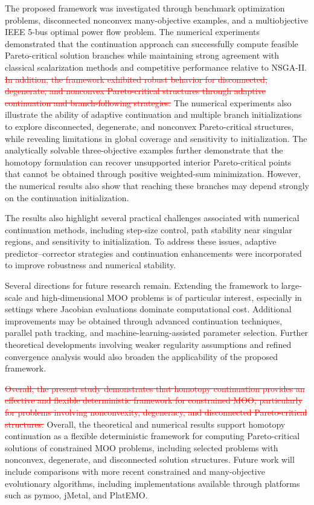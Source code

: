 \documentclass[11pt,pdflatex,sn-mathphys-ay]{sn-jnl}%
\theoremstyle{definition}
\theoremstyle{thmstyleone}%
\theoremstyle{thmstyletwo}%
\theoremstyle{thmstylethree}%
\newcommand{\del}[1]{\textcolor{red}{\sout{#1}}}
\newcommand{\add}[1]{\textcolor{revisionblue}{#1}}
\begin{document}
	
	The proposed framework was investigated through benchmark optimization problems, disconnected nonconvex many-objective examples, and a multiobjective IEEE 5-bus optimal power flow problem. The numerical experiments demonstrated that the continuation approach can successfully compute feasible Pareto-critical solution branches while maintaining strong agreement with classical scalarization methods and competitive performance relative to NSGA-II. 
	\del{In addition, the framework exhibited robust
		behavior for disconnected, degenerate, and
		nonconvex Pareto-critical structures through
		adaptive continuation and branch-following
		strategies.}
	\add{The numerical experiments also illustrate
		the ability of adaptive continuation and
		multiple branch initializations to explore
		disconnected, degenerate, and nonconvex
		Pareto-critical structures, while revealing
		limitations in global coverage and
		sensitivity to initialization.} 
	\add{The analytically solvable three-objective
		examples further demonstrate that the
		homotopy formulation can recover unsupported
		interior Pareto-critical points that cannot
		be obtained through positive weighted-sum
		minimization. However, the numerical results
		also show that reaching these branches may
		depend strongly on the continuation
		initialization.}
	
	
	
	The results also highlight several practical challenges associated with numerical continuation methods, including step-size control, path stability near singular regions, and sensitivity to initialization. To address these issues, adaptive predictor--corrector strategies and continuation enhancements were incorporated to improve robustness and numerical stability.
	
	Several directions for future research remain. Extending the framework to large-scale and high-dimensional MOO problems is of particular interest, especially in settings where Jacobian evaluations dominate computational cost. Additional improvements may be obtained through advanced continuation techniques, parallel path tracking, and machine-learning-assisted parameter selection. Further theoretical developments involving weaker regularity assumptions and refined convergence analysis would also broaden the applicability of the proposed framework.
	
	
	\del{Overall, the present study demonstrates
		that homotopy continuation provides an
		effective and flexible deterministic
		framework for constrained MOO, particularly
		for problems involving nonconvexity,
		degeneracy, and disconnected Pareto-critical
		structures.}
	\add{Overall, the theoretical and numerical
		results support homotopy continuation as a
		flexible deterministic framework for
		computing Pareto-critical solutions of
		constrained MOO problems, including selected
		problems with nonconvex, degenerate, and
		disconnected solution structures.}
	\add{Future work will include comparisons with
		more recent constrained and many-objective
		evolutionary algorithms, including implementations
		available through platforms such as pymoo,
		jMetal, and PlatEMO.}
	
\end{document}
